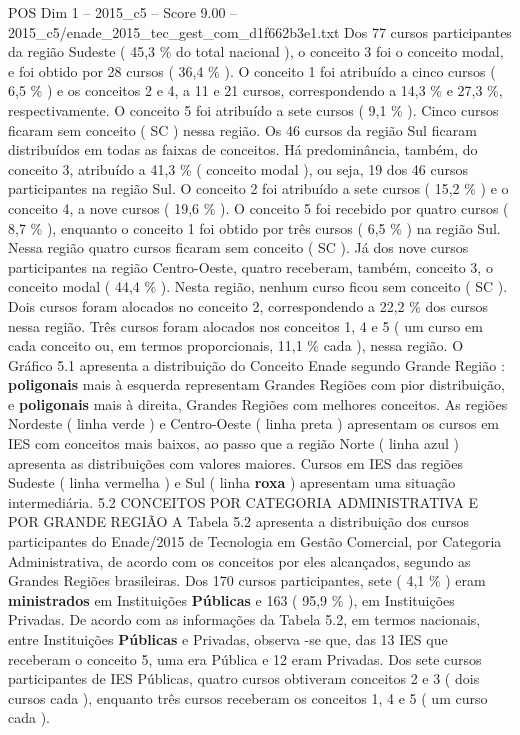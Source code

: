 \begin{textsample}{POS Dim 1 – 2015\_c5 – Score 9.00 – 2015\_c5/enade\_2015\_tec\_gest\_com\_d1f662b3e1.txt}
Dos 77 cursos participantes da região Sudeste ( 45,3 \% do total nacional ), o conceito 3 foi o conceito modal, e foi obtido por 28 cursos ( 36,4 \% ).
O conceito 1 foi atribuído a cinco cursos ( 6,5 \% ) e os conceitos 2 e 4, a 11 e 21 cursos, correspondendo a 14,3 \% e 27,3 \%, respectivamente.
O conceito 5 foi atribuído a sete cursos ( 9,1 \% ).
Cinco cursos ficaram sem conceito ( SC ) nessa região.
Os 46 cursos da região Sul ficaram distribuídos em todas as faixas de conceitos.
Há predominância, também, do conceito 3, atribuído a 41,3 \% ( conceito modal ), ou seja, 19 dos 46 cursos participantes na região Sul.
O conceito 2 foi atribuído a sete cursos ( 15,2 \% ) e o conceito 4, a nove cursos ( 19,6 \% ).
O conceito 5 foi recebido por quatro cursos ( 8,7 \% ), enquanto o conceito 1 foi obtido por três cursos ( 6,5 \% ) na região Sul.
Nessa região quatro cursos ficaram sem conceito ( SC ).
Já dos nove cursos participantes na região Centro-Oeste, quatro receberam, também, conceito 3, o conceito modal ( 44,4 \% ).
Nesta região, nenhum curso ficou sem conceito ( SC ).
Dois cursos foram alocados no conceito 2, correspondendo a 22,2 \% dos cursos nessa região.
Três cursos foram alocados nos conceitos 1, 4 e 5 ( um curso em cada conceito ou, em termos proporcionais, 11,1 \% cada ), nessa região.
O Gráfico 5.1 apresenta a distribuição do Conceito Enade segundo Grande Região : \textbf{poligonais} mais à esquerda representam Grandes Regiões com pior distribuição, e \textbf{poligonais} mais à direita, Grandes Regiões com melhores conceitos.
As regiões Nordeste ( linha verde ) e Centro-Oeste ( linha preta ) apresentam os cursos em IES com conceitos mais baixos, ao passo que a região Norte ( linha azul ) apresenta as distribuições com valores maiores.
Cursos em IES das regiões Sudeste ( linha vermelha ) e Sul ( linha \textbf{roxa} ) apresentam uma situação intermediária. 5.2 CONCEITOS POR CATEGORIA ADMINISTRATIVA E POR GRANDE REGIÃO A Tabela 5.2 apresenta a distribuição dos cursos participantes do Enade/2015 de Tecnologia em Gestão Comercial, por Categoria Administrativa, de acordo com os conceitos por eles alcançados, segundo as Grandes Regiões brasileiras.
Dos 170 cursos participantes, sete ( 4,1 \% ) eram \textbf{ministrados} em Instituições \textbf{Públicas} e 163 ( 95,9 \% ), em Instituições Privadas.
De acordo com as informações da Tabela 5.2, em termos nacionais, entre Instituições \textbf{Públicas} e Privadas, observa -se que, das 13 IES que receberam o conceito 5, uma era Pública e 12 eram Privadas.
Dos sete cursos participantes de IES Públicas, quatro cursos obtiveram conceitos 2 e 3 ( dois cursos cada ), enquanto três cursos receberam os conceitos 1, 4 e 5 ( um curso cada ).

\end{textsample}
